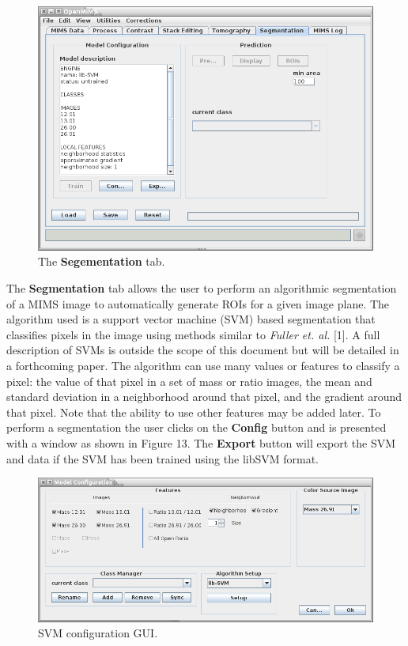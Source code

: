 \documentclass{article}
\begin{document}
	\begin{figure}[h]
	\centering
	\includegraphics[scale=0.70]{snapshot_MimsSegmentation.png}
	\caption{The \textbf{Segementation} tab.}
	\end{figure}
	The \textbf{Segmentation} tab allows the user to perform an algorithmic segmentation of a MIMS image to automatically generate ROIs for a given image plane. The algorithm used is a support vector machine (SVM) based segmentation that classifies pixels in the image using methods similar to \textit{Fuller et. al.} [1]. A full description of SVMs is outside the scope of this document but will be detailed in a forthcoming paper.  The algorithm can use many values or features to classify a pixel: the value of that pixel in a set of mass or ratio images, the mean and standard deviation in a neighborhood around that pixel, and the gradient around that pixel. Note that the ability to use other features may be added later. To perform a segmentation the user clicks on the \textbf{Config} button and is presented with a window as shown in Figure 13.  The \textbf{Export} button will export the SVM and data if the SVM has been trained using the libSVM format.

	\begin{figure}[h]
	\centering
	\includegraphics[scale=0.65]{snapshot_Model_Config.png}
	\caption{SVM configuration GUI.}
	\end{figure}
\end{document}
